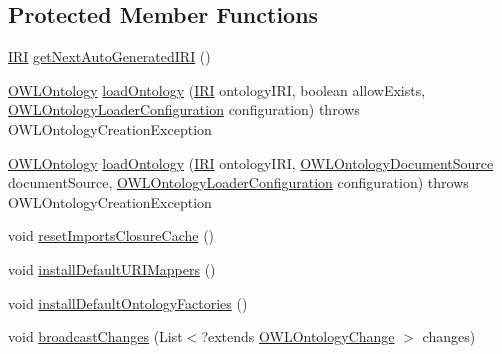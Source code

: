 \subsection*{Protected Member Functions}
\begin{DoxyCompactItemize}
\item 
\hyperlink{classorg_1_1semanticweb_1_1owlapi_1_1model_1_1_i_r_i}{I\-R\-I} \hyperlink{classuk_1_1ac_1_1manchester_1_1cs_1_1owl_1_1owlapi_1_1_o_w_l_ontology_manager_impl_ad582b3f571915d84b025e9b5b9acf022}{get\-Next\-Auto\-Generated\-I\-R\-I} ()
\item 
\hyperlink{interfaceorg_1_1semanticweb_1_1owlapi_1_1model_1_1_o_w_l_ontology}{O\-W\-L\-Ontology} \hyperlink{classuk_1_1ac_1_1manchester_1_1cs_1_1owl_1_1owlapi_1_1_o_w_l_ontology_manager_impl_a1a64d2215567d188e870491df16e2596}{load\-Ontology} (\hyperlink{classorg_1_1semanticweb_1_1owlapi_1_1model_1_1_i_r_i}{I\-R\-I} ontology\-I\-R\-I, boolean allow\-Exists, \hyperlink{classorg_1_1semanticweb_1_1owlapi_1_1model_1_1_o_w_l_ontology_loader_configuration}{O\-W\-L\-Ontology\-Loader\-Configuration} configuration)  throws O\-W\-L\-Ontology\-Creation\-Exception 
\item 
\hyperlink{interfaceorg_1_1semanticweb_1_1owlapi_1_1model_1_1_o_w_l_ontology}{O\-W\-L\-Ontology} \hyperlink{classuk_1_1ac_1_1manchester_1_1cs_1_1owl_1_1owlapi_1_1_o_w_l_ontology_manager_impl_ac61842b3b6f77f3cca09c2e994ff36f4}{load\-Ontology} (\hyperlink{classorg_1_1semanticweb_1_1owlapi_1_1model_1_1_i_r_i}{I\-R\-I} ontology\-I\-R\-I, \hyperlink{interfaceorg_1_1semanticweb_1_1owlapi_1_1io_1_1_o_w_l_ontology_document_source}{O\-W\-L\-Ontology\-Document\-Source} document\-Source, \hyperlink{classorg_1_1semanticweb_1_1owlapi_1_1model_1_1_o_w_l_ontology_loader_configuration}{O\-W\-L\-Ontology\-Loader\-Configuration} configuration)  throws O\-W\-L\-Ontology\-Creation\-Exception 
\item 
void \hyperlink{classuk_1_1ac_1_1manchester_1_1cs_1_1owl_1_1owlapi_1_1_o_w_l_ontology_manager_impl_aa71ece5af7f4884c607150c9d17f2099}{reset\-Imports\-Closure\-Cache} ()
\item 
void \hyperlink{classuk_1_1ac_1_1manchester_1_1cs_1_1owl_1_1owlapi_1_1_o_w_l_ontology_manager_impl_a1500a817b3af899eac2f2b9683452c4f}{install\-Default\-U\-R\-I\-Mappers} ()
\item 
void \hyperlink{classuk_1_1ac_1_1manchester_1_1cs_1_1owl_1_1owlapi_1_1_o_w_l_ontology_manager_impl_a5e8a99ed298e077fdbe4f83a0ec590e4}{install\-Default\-Ontology\-Factories} ()
\item 
void \hyperlink{classuk_1_1ac_1_1manchester_1_1cs_1_1owl_1_1owlapi_1_1_o_w_l_ontology_manager_impl_a2c006866f08557ca5752aa47ebed2e36}{broadcast\-Changes} (List$<$?extends \hyperlink{classorg_1_1semanticweb_1_1owlapi_1_1model_1_1_o_w_l_ontology_change}{O\-W\-L\-Ontology\-Change} $>$ changes)

\end{DoxyCompactItemize}
